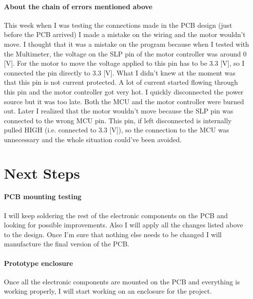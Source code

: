 \documentclass{article}
\begin{document}
\paragraph{About the chain of errors mentioned above}
This week when I was testing the connections made in the PCB design (just before the PCB arrived) I made a mistake on the wiring and the motor wouldn't move. I thought that it was a mistake on the program because when I tested with the Multimeter, the voltage on the SLP pin of the motor controller was around 0 [V]. For the motor to move the voltage applied to this pin has to be 3.3 [V], so I connected the pin directly to 3.3 [V]. What I didn't knew at the moment was that this pin is not current protected. A lot of current started flowing through this pin and the motor controller got very hot. I quickly disconnected the power source but it was too late. Both the MCU and the motor controller were burned out. Later I realized that the motor wouldn't move because the SLP pin was connected to the wrong MCU pin. This pin, if left disconnected is internally pulled HIGH (i.e. connected to 3.3 [V]), so the connection to the MCU was unnecessary and the whole situation could've  been avoided.
\section{Next Steps}

\paragraph{PCB mounting testing}
I will keep soldering the rest of the electronic components on the PCB and looking for possible improvements. Also I will apply all the changes listed above to the design. Once I'm sure that nothing else needs to be changed I will manufacture the final version of the PCB.

\paragraph{Prototype enclosure}
Once all the electronic components are mounted on the PCB and everything is working properly, I will start working on an enclosure for the project.
\end{document}
